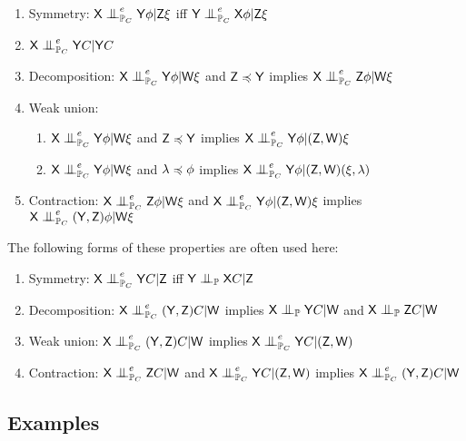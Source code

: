 \begin{enumerate}
    \item Symmetry: $\RV{X}\CI_{\prob{P}_C}^e \RV{Y} \phi|\RV{Z}\xi$ iff $\RV{Y}\CI_{\prob{P}_C}^e \RV{X} \phi|\RV{Z}\xi$
    \item $\RV{X}\CI_{\prob{P}_C}^e \RV{Y} C| \RV{Y} C$
    \item Decomposition: $\RV{X}\CI_{\prob{P}_C}^e \RV{Y} \phi|\RV{W}\xi$ and $\mathsf{Z}\preccurlyeq\mathsf{Y}$ implies $\RV{X}\CI_{\prob{P}_C}^e\RV{Z}\phi|\RV{W}\xi$
    \item Weak union:
    \begin{enumerate}
     	\item $\RV{X}\CI_{\prob{P}_C}^e \RV{Y} \phi|\RV{W}\xi$ and $\mathsf{Z}\preccurlyeq \mathsf{Y}$ implies $\RV{X}\CI_{\prob{P}_C}^e\RV{Y}\phi|(\RV{Z},\RV{W})\xi$
     	\item $\RV{X}\CI_{\prob{P}_C}^e \RV{Y} \phi|\RV{W}\xi$ and $\lambda\preccurlyeq \phi$ implies $\RV{X}\CI_{\prob{P}_C}^e\RV{Y}\phi|(\RV{Z},\RV{W})(\xi,\lambda)$
     \end{enumerate} 
    \item Contraction: $\RV{X}\CI_{\prob{P}_C}^e\RV{Z}\phi|\RV{W}\xi$ and $\RV{X}\CI_{\prob{P}_C}^e\RV{Y}\phi|(\RV{Z},\RV{W})\xi$ implies $\RV{X}\CI_{\prob{P}_C}^e(\RV{Y},\RV{Z})\phi|\RV{W}\xi$
\end{enumerate} 

The following forms of these properties are often used here:

\begin{enumerate}
    \item Symmetry: $\RV{X}\CI_{\prob{P}_C}^e \RV{Y} C|\RV{Z}$ iff $\RV{Y}\CI_{\prob{P}} \RV{X} C|\RV{Z}$
    \item Decomposition: $\RV{X}\CI_{\prob{P}_C}^e (\RV{Y},\RV{Z})C|\RV{W}$ implies $\RV{X}\CI_{\prob{P}}\RV{Y}C|\RV{W}$ and $\RV{X}\CI_{\prob{P}}\RV{Z}C|\RV{W}$
    \item Weak union: $\RV{X}\CI_{\prob{P}_C}^e(\RV{Y},\RV{Z})C|\RV{W}$ implies $\RV{X}\CI_{\prob{P}_C}^e\RV{Y}C|(\RV{Z},\RV{W})$
    \item Contraction: $\RV{X}\CI_{\prob{P}_C}^e\RV{Z}C|\RV{W}$ and $\RV{X}\CI_{\prob{P}_C}^e\RV{Y}C|(\RV{Z},\RV{W})$ implies $\RV{X}\CI_{\prob{P}_C}^e(\RV{Y},\RV{Z})C|\RV{W}$
\end{enumerate}

\subsection{Examples}

